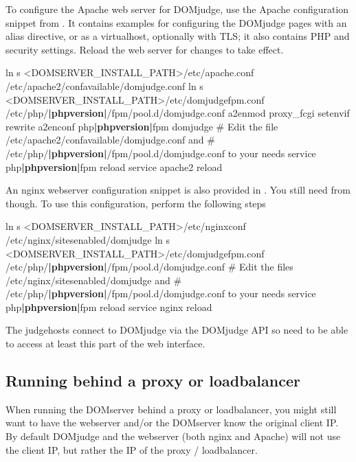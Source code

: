 \documentclass[a4paper,10pt,english,openany]{sphinxmanual}
\begin{document}
\sphinxAtStartPar
To configure the Apache web server for DOMjudge, use the Apache
configuration snippet from . It contains
examples for configuring the DOMjudge pages with an alias directive,
or as a virtualhost, optionally with TLS; it also contains PHP and security
settings. Reload the web server for changes to take effect.
\begin{sphinxalltt}
ln \sphinxhyphen{}s \textless{}DOMSERVER\_INSTALL\_PATH\textgreater{}/etc/apache.conf /etc/apache2/conf\sphinxhyphen{}available/domjudge.conf
ln \sphinxhyphen{}s \textless{}DOMSERVER\_INSTALL\_PATH\textgreater{}/etc/domjudge\sphinxhyphen{}fpm.conf /etc/php/{\color{red}\bfseries{}|phpversion|}/fpm/pool.d/domjudge.conf
a2enmod proxy\_fcgi setenvif rewrite
a2enconf php{\color{red}\bfseries{}|phpversion|}\sphinxhyphen{}fpm domjudge
\# Edit the file /etc/apache2/conf\sphinxhyphen{}available/domjudge.conf and
\# /etc/php/{\color{red}\bfseries{}|phpversion|}/fpm/pool.d/domjudge.conf to your needs
service php{\color{red}\bfseries{}|phpversion|}\sphinxhyphen{}fpm reload
service apache2 reload
\end{sphinxalltt}

\sphinxAtStartPar
An nginx webserver configuration snippet is also provided in
.  You still need  from 
though. To use this configuration, perform the following steps
\begin{sphinxalltt}
ln \sphinxhyphen{}s \textless{}DOMSERVER\_INSTALL\_PATH\textgreater{}/etc/nginx\sphinxhyphen{}conf /etc/nginx/sites\sphinxhyphen{}enabled/domjudge
ln \sphinxhyphen{}s \textless{}DOMSERVER\_INSTALL\_PATH\textgreater{}/etc/domjudge\sphinxhyphen{}fpm.conf /etc/php/{\color{red}\bfseries{}|phpversion|}/fpm/pool.d/domjudge.conf
\# Edit the files /etc/nginx/sites\sphinxhyphen{}enabled/domjudge and
\# /etc/php/{\color{red}\bfseries{}|phpversion|}/fpm/pool.d/domjudge.conf to your needs
service php{\color{red}\bfseries{}|phpversion|}\sphinxhyphen{}fpm reload
service nginx reload
\end{sphinxalltt}

\sphinxAtStartPar
The judgehosts connect to DOMjudge via the DOMjudge API so need
to be able to access at least this part of the web interface.


\subsection{Running behind a proxy or loadbalancer}
\label{\detokenize{install-domserver:running-behind-a-proxy-or-loadbalancer}}
\sphinxAtStartPar
When running the DOMserver behind a proxy or loadbalancer, you might still want
to have the webserver and/or the DOMserver know the original client IP. By
default DOMjudge and the webserver (both nginx and Apache) will not use the
client IP, but rather the IP of the proxy / loadbalancer.
\end{document}
